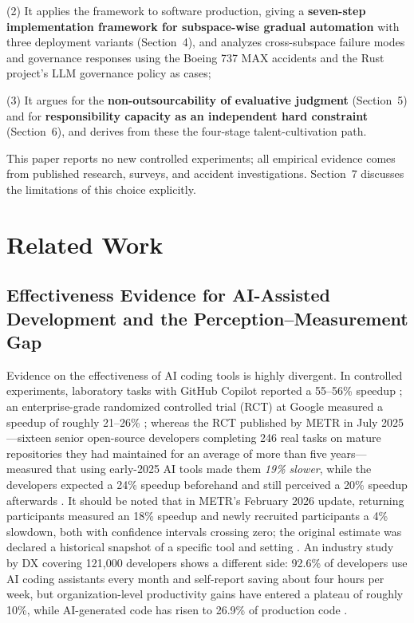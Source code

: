 \documentclass[11pt]{article}
\begin{document}
(2) It applies the framework to software production, giving a
\textbf{seven-step implementation framework for subspace-wise gradual
automation} with three deployment variants (Section~4), and analyzes
cross-subspace failure modes and governance responses using the Boeing 737
MAX accidents and the Rust project's LLM governance policy as cases;

(3) It argues for the \textbf{non-outsourcability of evaluative judgment}
(Section~5) and for \textbf{responsibility capacity as an independent hard
constraint} (Section~6), and derives from these the four-stage
talent-cultivation path.

This paper reports no new controlled experiments; all empirical evidence
comes from published research, surveys, and accident investigations.
Section~7 discusses the limitations of this choice explicitly.

\section{Related Work}
\subsection{Effectiveness Evidence for AI-Assisted Development and the
Perception--Measurement Gap}
Evidence on the effectiveness of AI coding tools is highly divergent. In
controlled experiments, laboratory tasks with GitHub Copilot reported a
55--56\% speedup \cite{copilot}; an enterprise-grade randomized controlled
trial (RCT) at Google measured a speedup of roughly 21--26\%
\cite{google_rct}; whereas the RCT published by METR in July 2025---sixteen
senior open-source developers completing 246 real tasks on mature
repositories they had maintained for an average of more than five
years---measured that using early-2025 AI tools made them \emph{19\%
slower}, while the developers expected a 24\% speedup beforehand and still
perceived a 20\% speedup afterwards \cite{metr}. It should be noted that in
METR's February 2026 update, returning participants measured an 18\%
speedup and newly recruited participants a 4\% slowdown, both with
confidence intervals crossing zero; the original estimate was declared a
historical snapshot of a specific tool and setting \cite{metr}. An industry
study by DX covering 121,000 developers shows a different side: 92.6\% of
developers use AI coding assistants every month and self-report saving
about four hours per week, but organization-level productivity gains have
entered a plateau of roughly 10\%, while AI-generated code has risen to
26.9\% of production code \cite{dx}.
\end{document}
